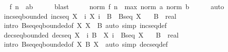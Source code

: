 \begin{isabellebody}
\ \isamarkupfalse%
\ {\isachardoublequoteopen}f\ n\ {\isasymin}\ {\isacharbraceleft}{\kern0pt}a{\isachardot}{\kern0pt}{\isachardot}{\kern0pt}b{\isacharbraceright}{\kern0pt}{\isachardoublequoteclose}\isanewline
\ \ \ \ \isamarkupfalse%
\ blast\isanewline
\ \ \isamarkupfalse%
\ \isamarkupfalse%
\ {\isachardoublequoteopen}norm\ {\isacharparenleft}{\kern0pt}f\ n{\isacharparenright}{\kern0pt}\ {\isasymle}\ max\ {\isacharparenleft}{\kern0pt}norm\ a{\isacharparenright}{\kern0pt}\ {\isacharparenleft}{\kern0pt}norm\ b{\isacharparenright}{\kern0pt}{\isachardoublequoteclose}\isanewline
\ \ \ \ \isamarkupfalse%
\ auto\isanewline
{}\isamarkupfalse%
%
\endisatagproof
{\isafoldproof}%
%
\isadelimproof
\isanewline
%
\endisadelimproof
\isanewline
{}\isamarkupfalse%
\ incseq{\isacharunderscore}{\kern0pt}bounded{\isacharcolon}{\kern0pt}\ {\isachardoublequoteopen}incseq\ X\ {\isasymLongrightarrow}\ {\isasymforall}i{\isachardot}{\kern0pt}\ X\ i\ {\isasymle}\ B\ {\isasymLongrightarrow}\ Bseq\ X{\isachardoublequoteclose}\isanewline
\ \ \ B\ {\isacharcolon}{\kern0pt}{\isacharcolon}{\kern0pt}\ real\isanewline
%
\isadelimproof
\ \ %
\endisadelimproof
%
\isatagproof
{}\isamarkupfalse%
\ {\isacharparenleft}{\kern0pt}intro\ Bseq{\isacharunderscore}{\kern0pt}eq{\isacharunderscore}{\kern0pt}bounded{\isacharbrackleft}{\kern0pt}of\ X\ {\isachardoublequoteopen}X\ {}{\isachardoublequoteclose}\ B{\isacharbrackright}{\kern0pt}{\isacharparenright}{\kern0pt}\ {\isacharparenleft}{\kern0pt}auto\ simp{\isacharcolon}{\kern0pt}\ incseq{\isacharunderscore}{\kern0pt}def{\isacharparenright}{\kern0pt}%
\endisatagproof
{\isafoldproof}%
%
\isadelimproof
\isanewline
%
\endisadelimproof
\isanewline
{}\isamarkupfalse%
\ decseq{\isacharunderscore}{\kern0pt}bounded{\isacharcolon}{\kern0pt}\ {\isachardoublequoteopen}decseq\ X\ {\isasymLongrightarrow}\ {\isasymforall}i{\isachardot}{\kern0pt}\ B\ {\isasymle}\ X\ i\ {\isasymLongrightarrow}\ Bseq\ X{\isachardoublequoteclose}\isanewline
\ \ \ B\ {\isacharcolon}{\kern0pt}{\isacharcolon}{\kern0pt}\ real\isanewline
%
\isadelimproof
\ \ %
\endisadelimproof
%
\isatagproof
{}\isamarkupfalse%
\ {\isacharparenleft}{\kern0pt}intro\ Bseq{\isacharunderscore}{\kern0pt}eq{\isacharunderscore}{\kern0pt}bounded{\isacharbrackleft}{\kern0pt}of\ X\ B\ {\isachardoublequoteopen}X\ {}{\isachardoublequoteclose}{\isacharbrackright}{\kern0pt}{\isacharparenright}{\kern0pt}\ {\isacharparenleft}{\kern0pt}auto\ simp{\isacharcolon}{\kern0pt}\ decseq{\isacharunderscore}{\kern0pt}def{\isacharparenright}{\kern0pt}%

\end{isabellebody}
